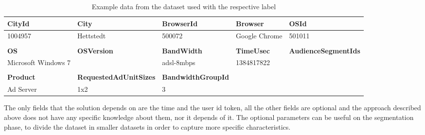 \begin{table}[h]
\begin{tabular}{lllll}
\multicolumn{1}{l|}{\textbf{CityId}}                  & \multicolumn{1}{l|}{\textbf{City}}                        & \multicolumn{1}{l|}{\textbf{BrowserId}}        & \multicolumn{1}{l|}{\textbf{Browser}}  & \textbf{OSId}               \\ \hline
\multicolumn{1}{l|}{1004957}                          & \multicolumn{1}{l|}{Hettstedt}                            & \multicolumn{1}{l|}{500072}                    & \multicolumn{1}{l|}{Google Chrome}     & 501011                      \\
                                                      &                                                           &                                                &                                        &                             \\
\multicolumn{1}{l|}{\textbf{OS}}                      & \multicolumn{1}{l|}{\textbf{OSVersion}}                   & \multicolumn{1}{l|}{\textbf{BandWidth}}        & \multicolumn{1}{l|}{\textbf{TimeUsec}} & \textbf{AudienceSegmentIds} \\ \hline
\multicolumn{1}{l|}{Microsoft Windows 7}              & \multicolumn{1}{l|}{}                                     & \multicolumn{1}{l|}{adsl-8mbps}                & \multicolumn{1}{l|}{1384817822}        &                             \\
                                                      &                                                           &                                                &                                        &                             \\
\multicolumn{1}{l|}{\textbf{Product}}                 & \multicolumn{1}{l|}{\textbf{RequestedAdUnitSizes}}        & \multicolumn{1}{l|}{\textbf{BandwidthGroupId}} &                                        &                             \\ \cline{1-3}
\multicolumn{1}{l|}{Ad Server}                        & \multicolumn{1}{l|}{1x2}                                  & \multicolumn{1}{l|}{3}                         &                                        &                            
\end{tabular}
\caption{Example data from the dataset used with the respective label}\label{tab:dataset}
\end{table}

The only fields that the solution depends on are the time and the user id token,
all the other fields are optional and the approach described above does not have
any specific knowledge about them, nor it depends of it. The optional parameters
can be useful on the segmentation phase, to divide the dataset in smaller
datasets in order to capture more specific characteristics.

